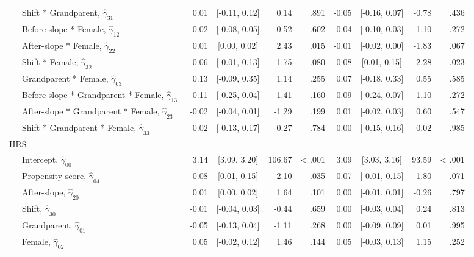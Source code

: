 \documentclass[
  english,
  man, noextraspace]{apa7}
\newenvironment{lltable}{\begin{landscape}\begin{center}\begin{ThreePartTable}}{\end{ThreePartTable}\end{center}\end{landscape}}
\begin{document}
\begin{appendix}
\begin{lltable}
{\begin{longtable}{lrcrrrcrr}
\ \ \ Shift * Grandparent, $\hat{\gamma}_{31}$ \textcolor{white}{L} & 0.01 & [-0.11, 0.12] & 0.14 & .891 & -0.05 & [-0.16, 0.07] & -0.78 & .436\\
\ \ \ Before-slope * Female, $\hat{\gamma}_{12}$ & -0.02 & [-0.08, 0.05] & -0.52 & .602 & -0.04 & [-0.10, 0.03] & -1.10 & .272\\
\ \ \ After-slope * Female, $\hat{\gamma}_{22}$ \textcolor{white}{L} & 0.01 & [0.00, 0.02] & 2.43 & .015 & -0.01 & [-0.02, 0.00] & -1.83 & .067\\
\ \ \ Shift * Female, $\hat{\gamma}_{32}$ \textcolor{white}{L} & 0.06 & [-0.01, 0.13] & 1.75 & .080 & 0.08 & [0.01, 0.15] & 2.28 & .023\\
\ \ \ Grandparent * Female, $\hat{\gamma}_{03}$ \textcolor{white}{L} & 0.13 & [-0.09, 0.35] & 1.14 & .255 & 0.07 & [-0.18, 0.33] & 0.55 & .585\\
\ \ \ Before-slope * Grandparent * Female, $\hat{\gamma}_{13}$ & -0.11 & [-0.25, 0.04] & -1.41 & .160 & -0.09 & [-0.24, 0.07] & -1.10 & .272\\
\ \ \ After-slope * Grandparent * Female, $\hat{\gamma}_{23}$ \textcolor{white}{L} & -0.02 & [-0.04, 0.01] & -1.29 & .199 & 0.01 & [-0.02, 0.03] & 0.60 & .547\\
\ \ \ Shift * Grandparent * Female, $\hat{\gamma}_{33}$ \textcolor{white}{L} & 0.02 & [-0.13, 0.17] & 0.27 & .784 & 0.00 & [-0.15, 0.16] & 0.02 & .985\\
HRS &  &  &  &  &  &  &  & \\
\ \ \ Intercept, $\hat{\gamma}_{00}$ \textcolor{white}{H} & 3.14 & [3.09, 3.20] & 106.67 & < .001 & 3.09 & [3.03, 3.16] & 93.59 & < .001\\
\ \ \ Propensity score, $\hat{\gamma}_{04}$ \textcolor{white}{H} & 0.08 & [0.01, 0.15] & 2.10 & .035 & 0.07 & [-0.01, 0.15] & 1.80 & .071\\
\ \ \ After-slope, $\hat{\gamma}_{20}$ \textcolor{white}{H} & 0.01 & [0.00, 0.02] & 1.64 & .101 & 0.00 & [-0.01, 0.01] & -0.26 & .797\\
\ \ \ Shift, $\hat{\gamma}_{30}$ \textcolor{white}{H} & -0.01 & [-0.04, 0.03] & -0.44 & .659 & 0.00 & [-0.03, 0.04] & 0.24 & .813\\
\ \ \ Grandparent, $\hat{\gamma}_{01}$ \textcolor{white}{H} & -0.05 & [-0.13, 0.04] & -1.11 & .268 & 0.00 & [-0.09, 0.09] & 0.01 & .995\\
\ \ \ Female, $\hat{\gamma}_{02}$ \textcolor{white}{H} & 0.05 & [-0.02, 0.12] & 1.46 & .144 & 0.05 & [-0.03, 0.13] & 1.15 & .252\\

\end{longtable}}
\end{lltable}
\end{appendix}
\end{document}
